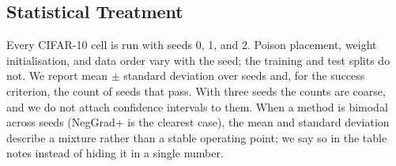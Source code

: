 \subsection{Statistical Treatment}
Every CIFAR-10 cell is run with seeds 0, 1, and 2. Poison placement, weight
initialisation, and data order vary with the seed; the training and test splits
do not. We report mean $\pm$ standard deviation over seeds and, for the success
criterion, the count of seeds that pass. With three seeds the counts are coarse,
and we do not attach confidence intervals to them. When a method is bimodal
across seeds (NegGrad+ is the clearest case), the mean and standard deviation
describe a mixture rather than a stable operating point; we say so in the table
notes instead of hiding it in a single number.

